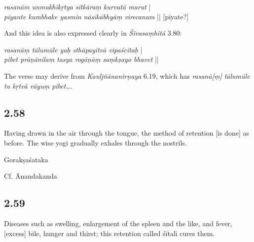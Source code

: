 \begin{ekdosis}
\begin{philcomm}[hp02_057]
\emph{rasanām unmukhīkṛtya sītkāraṃ kurvatā marut} |\\
\emph{pīyante kumbhake yasmin nāsikābhyāṃ virecanam} || [pīyate?]

And this idea is also expressed clearly in \emph{Śivasaṃhitā} 3.80:

\emph{rasanāṃ tālumūle yaḥ sthāpayitvā vipaścitaḥ} |\\
\emph{pibet prāṇānilaṃ tasya rogāṇāṃ saṃkṣayo bhavet} ||

The verse may derive from \emph{Kauljñānanirṇaya} 6.19, which has \emph{rasanā[ṃ] tālumūle tu kṛtvā vāyuṃ pibet…}.
\end{philcomm}

\subsection*{2.58}
\begin{translation}[hp02_058]
Having drawn in the air through the tongue, the method of retention [is done] as before. The wise yogi gradually exhales through the nostrils.
\end{translation}

\begin{sources}[hp02_058]
Gorakṣaśataka

\begin{versinnote}
\end{versinnote}
\end{sources}

\begin{testimonia}[hp02_058]
Cf. Ānandakanda

\begin{versinnote}
\end{versinnote}
\end{testimonia}

\begin{philcomm}[hp02_058]
\end{philcomm}

\subsection*{2.59}
\begin{translation}[hp02_059]
Diseases such as swelling, enlargement of the spleen and the like, and fever, [excess] bile, hunger and thirst; this retention called śītalī cures them.
\end{translation}


\end{ekdosis}
